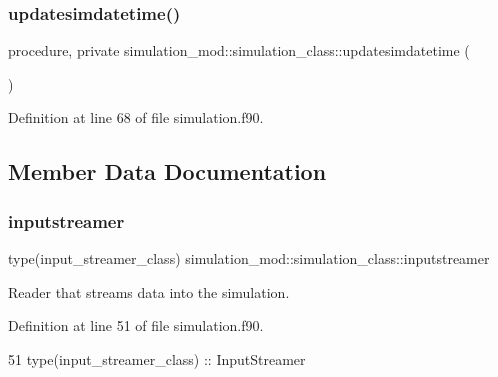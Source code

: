 \subsubsection{\texorpdfstring{updatesimdatetime()}{updatesimdatetime()}}
{\footnotesize\ttfamily procedure, private simulation\+\_\+mod\+::simulation\+\_\+class\+::updatesimdatetime (\begin{DoxyParamCaption}{ }\end{DoxyParamCaption})\hspace{0.3cm}{\ttfamily [private]}}



Definition at line 68 of file simulation.\+f90.



\subsection{Member Data Documentation}
\mbox{\label{structsimulation__mod_1_1simulation__class_a40add8001e631510e3530931b9a9d06a}} 
\subsubsection{\texorpdfstring{inputstreamer}{inputstreamer}}
{\footnotesize\ttfamily type(input\+\_\+streamer\+\_\+class) simulation\+\_\+mod\+::simulation\+\_\+class\+::inputstreamer\hspace{0.3cm}{\ttfamily [private]}}



Reader that streams data into the simulation. 



Definition at line 51 of file simulation.\+f90.


\begin{DoxyCode}
51         \textcolor{keywordtype}{type}(input\_streamer\_class)  :: InputStreamer
\end{DoxyCode}
\mbox{\label{structsimulation__mod_1_1simulation__class_a75e838871eedd2fd66dc7d9bfce015ad}} 
